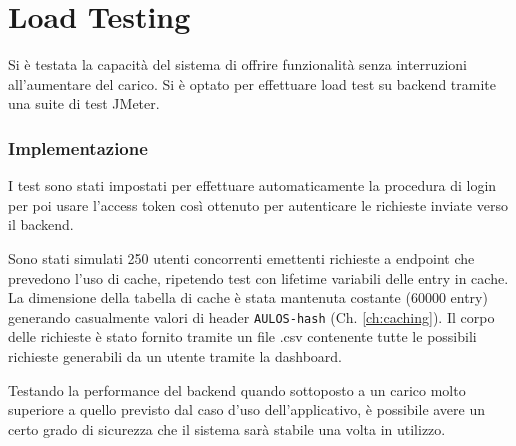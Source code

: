 \chapter{Load Testing}
\label{ch:stresstesting}
Si è testata la capacità del sistema di offrire funzionalità senza interruzioni all'aumentare del carico. 
Si è optato per effettuare load test su backend tramite una suite di test JMeter. \cite{JMETER}

\subsection{Implementazione}

I test sono stati impostati per effettuare automaticamente la procedura di login per poi usare l'access token così ottenuto per autenticare le richieste inviate verso il backend.

Sono stati simulati 250 utenti concorrenti emettenti richieste a endpoint che prevedono l'uso di cache, ripetendo test con lifetime variabili delle entry in cache.
La dimensione della tabella di cache è stata mantenuta costante (60000 entry) generando casualmente valori di header \verb|AULOS-hash| (Ch. \ref{ch:caching}).
Il corpo delle richieste è stato fornito tramite un file .csv contenente tutte le possibili richieste generabili da un utente tramite la dashboard.

Testando la performance del backend quando sottoposto a un carico molto superiore a quello previsto dal caso d'uso dell'applicativo, è possibile avere un certo grado di sicurezza che il sistema sarà stabile una volta in utilizzo.




